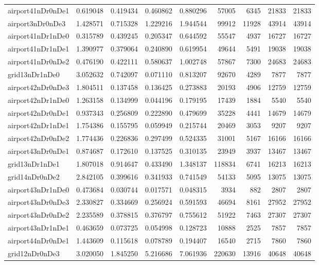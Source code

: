 \documentclass[../../../thesis.tex]{subfiles}
\begin{document}
\begin{longtable}{|l|r|r|r|r|r|r|r|r|}
airport41nDr0nDe1 & 0.619048 & 0.419434 & 0.460862 & 0.880296 & 57005 & 6345 & 21833 & 21833 \\
airport3nDr0nDe3 & 1.428571 & 0.715328 & 1.229216 & 1.944544 & 99912 & 11928 & 43914 & 43914 \\
airport41nDr1nDe0 & 0.315789 & 0.439245 & 0.205347 & 0.644592 & 55547 & 4937 & 16727 & 16727 \\
airport41nDr1nDe1 & 1.390977 & 0.379064 & 0.240890 & 0.619954 & 49644 & 5491 & 19038 & 19038 \\
airport41nDr0nDe2 & 0.476190 & 0.422111 & 0.580637 & 1.002748 & 57867 & 7300 & 24683 & 24683 \\
grid13nDr1nDe0 & 3.052632 & 0.742097 & 0.071110 & 0.813207 & 92670 & 4289 & 7877 & 7877 \\
airport42nDr0nDe3 & 1.804511 & 0.137458 & 0.136425 & 0.273883 & 20193 & 4906 & 12759 & 12759 \\
airport42nDr1nDe0 & 1.263158 & 0.134999 & 0.044196 & 0.179195 & 17439 & 1884 & 5540 & 5540 \\
airport42nDr0nDe1 & 0.937343 & 0.256809 & 0.222890 & 0.479699 & 35228 & 4441 & 14679 & 14679 \\
airport42nDr1nDe1 & 1.754386 & 0.155795 & 0.059949 & 0.215744 & 20469 & 3053 & 9207 & 9207 \\
airport42nDr0nDe2 & 1.774436 & 0.226836 & 0.297499 & 0.524335 & 31001 & 5167 & 16166 & 16166 \\
airport43nDr0nDe1 & 0.874687 & 0.172610 & 0.137525 & 0.310135 & 23949 & 3937 & 13467 & 13467 \\
grid13nDr1nDe1 & 1.807018 & 0.914647 & 0.433490 & 1.348137 & 118834 & 6741 & 16213 & 16213 \\
grid14nDr0nDe2 & 2.842105 & 0.399616 & 0.341933 & 0.741549 & 54133 & 5095 & 13075 & 13075 \\
airport43nDr1nDe0 & 0.473684 & 0.030744 & 0.017571 & 0.048315 & 3934 & 882 & 2807 & 2807 \\
airport43nDr0nDe3 & 2.330827 & 0.334669 & 0.256924 & 0.591593 & 46694 & 8161 & 27952 & 27952 \\
airport43nDr0nDe2 & 2.235589 & 0.378815 & 0.376797 & 0.755612 & 51922 & 7463 & 27307 & 27307 \\
airport43nDr1nDe1 & 0.463659 & 0.073725 & 0.054998 & 0.128723 & 10888 & 2525 & 7857 & 7857 \\
airport44nDr0nDe1 & 1.443609 & 0.115618 & 0.078789 & 0.194407 & 16540 & 2715 & 7860 & 7860 \\
grid12nDr0nDe3 & 3.020050 & 1.845250 & 5.216686 & 7.061936 & 220630 & 13916 & 40648 & 40648 \\

\end{longtable}
\end{document}
